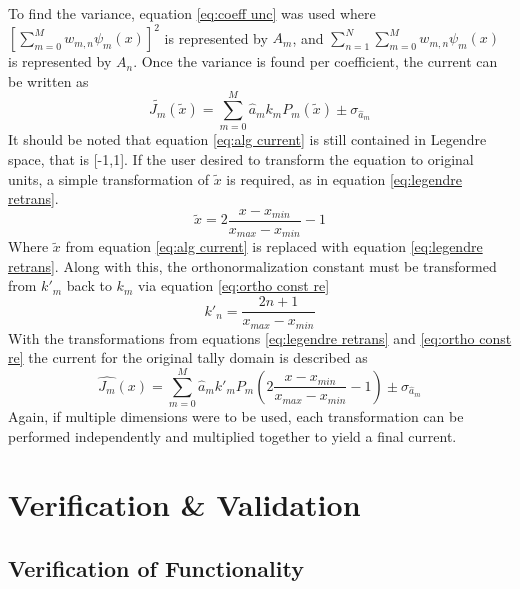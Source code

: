 \documentclass[10tma4paper]{article}
\begin{document}
To find the variance, equation \eqref{eq:coeff unc} was used where $[\sum_{m=0}^{M}w_{m,n}\psi_{m}(x)]^{2}$ is represented by $A_{m}$, and $\sum_{n=1}^{N}\sum_{m=0}^{M}w_{m,n}\psi_{m}(x)$ is represented by $A_{n}$. Once the variance is found per coefficient, the current can be written as
\begin{equation}\label{eq:alg current}
	\tilde{J_{m}}(\tilde{x}) = \sum_{m=0}^{M}\hat{a}_{m}k_{m}P_{m}(\tilde{x}) \pm  \sigma_{\hat{a}_{m}}
\end{equation}
It should be noted that equation \eqref{eq:alg current} is still contained in Legendre space, that is [-1,1]. If the user desired to transform the equation to original units, a simple transformation of $\tilde{x}$ is required, as in equation \eqref{eq:legendre retrans}.
\begin{equation}\label{eq:legendre retrans}
\tilde{x} = 2\frac{x-x_{min}}{x_{max}-x_{min}}-1
\end{equation}
Where $\tilde{x}$ from equation \eqref{eq:alg current} is replaced with equation \eqref{eq:legendre retrans}. Along with this, the orthonormalization constant must be transformed from $k'_{m}$ back to $k_{m}$ via equation \eqref{eq:ortho const re}
\begin{equation}\label{eq:ortho const re}
k'_{n} = \frac{2n+1}{x_{max}-x_{min}}
\end{equation}
With the transformations from equations \eqref{eq:legendre retrans} and \eqref{eq:ortho const re} the current for the original tally domain is described as 
\begin{equation}\label{eq:final current}
	\hat{J_{m}}(x) = \sum_{m=0}^{M}\hat{a}_{m}k'_{m}P_{m}(2\frac{x-x_{min}}{x_{max}-x_{min}}-1) \pm  \sigma_{\hat{a}_{m}}
\end{equation}
Again, if multiple dimensions were to be used, each transformation can be performed independently and multiplied together to yield a final current.


\section{Verification \& Validation}\label{vv}
\subsection{Verification of Functionality}\label{P1}
\end{document}
